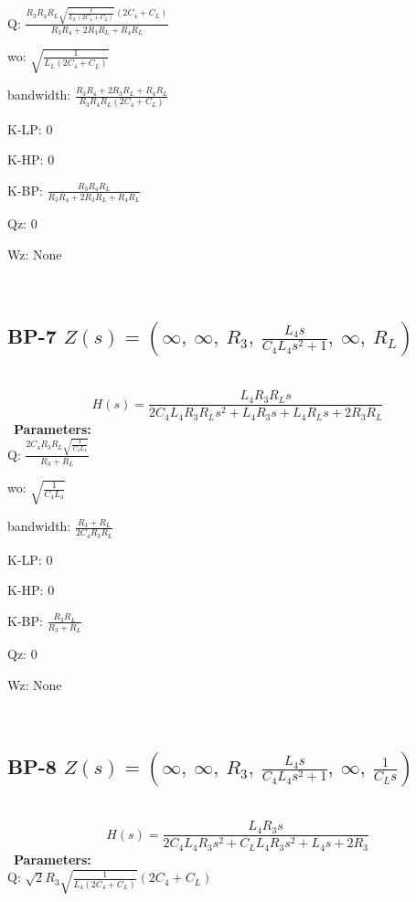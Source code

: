 \documentclass{article}
\begin{document}
Q: $\frac{R_{3} R_{4} R_{L} \sqrt{\frac{1}{L_{L} \left(2 C_{4} + C_{L}\right)}} \left(2 C_{4} + C_{L}\right)}{R_{3} R_{4} + 2 R_{3} R_{L} + R_{4} R_{L}}$\ 

wo: $\sqrt{\frac{1}{L_{L} \left(2 C_{4} + C_{L}\right)}}$\ 

bandwidth: $\frac{R_{3} R_{4} + 2 R_{3} R_{L} + R_{4} R_{L}}{R_{3} R_{4} R_{L} \left(2 C_{4} + C_{L}\right)}$\ 

K-LP: $0$\ 

K-HP: $0$\ 

K-BP: $\frac{R_{3} R_{4} R_{L}}{R_{3} R_{4} + 2 R_{3} R_{L} + R_{4} R_{L}}$\ 

Qz: $0$\ 

Wz: $\text{None}$\ 

\ 

\subsection{BP-7 $Z(s) = \left( \infty, \  \infty, \  R_{3}, \  \frac{L_{4} s}{C_{4} L_{4} s^{2} + 1}, \  \infty, \  R_{L}\right)$ } \ 
\textbf{\[H(s) = \frac{L_{4} R_{3} R_{L} s}{2 C_{4} L_{4} R_{3} R_{L} s^{2} + L_{4} R_{3} s + L_{4} R_{L} s + 2 R_{3} R_{L}}\] } \ 
\textbf{Parameters:}\\ 

Q: $\frac{2 C_{4} R_{3} R_{L} \sqrt{\frac{1}{C_{4} L_{4}}}}{R_{3} + R_{L}}$\ 

wo: $\sqrt{\frac{1}{C_{4} L_{4}}}$\ 

bandwidth: $\frac{R_{3} + R_{L}}{2 C_{4} R_{3} R_{L}}$\ 

K-LP: $0$\ 

K-HP: $0$\ 

K-BP: $\frac{R_{3} R_{L}}{R_{3} + R_{L}}$\ 

Qz: $0$\ 

Wz: $\text{None}$\ 

\ 

\subsection{BP-8 $Z(s) = \left( \infty, \  \infty, \  R_{3}, \  \frac{L_{4} s}{C_{4} L_{4} s^{2} + 1}, \  \infty, \  \frac{1}{C_{L} s}\right)$ } \ 
\textbf{\[H(s) = \frac{L_{4} R_{3} s}{2 C_{4} L_{4} R_{3} s^{2} + C_{L} L_{4} R_{3} s^{2} + L_{4} s + 2 R_{3}}\] } \ 
\textbf{Parameters:}\\ 

Q: $\sqrt{2} R_{3} \sqrt{\frac{1}{L_{4} \left(2 C_{4} + C_{L}\right)}} \left(2 C_{4} + C_{L}\right)$\ 
\end{document}
